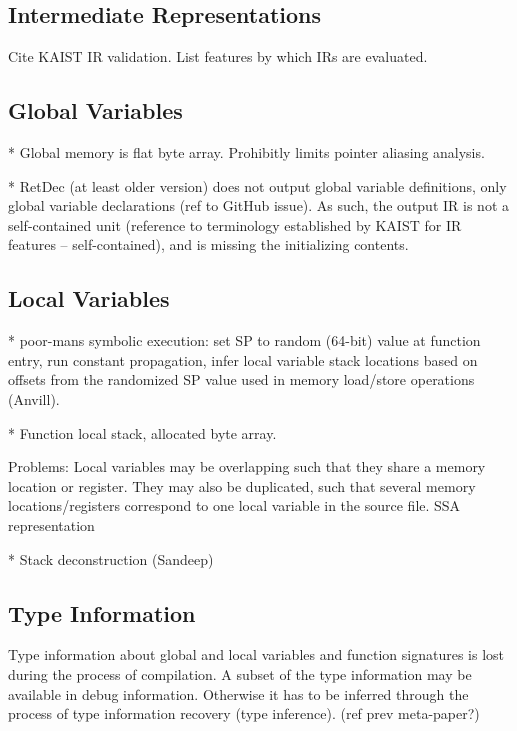 
\subsection{Intermediate Representations}

Cite KAIST IR validation. List features by which IRs are evaluated.


\subsection{Global Variables}

* Global memory is flat byte array. Prohibitly limits pointer aliasing analysis.

* RetDec (at least older version) does not output global variable definitions, only global variable declarations (ref to GitHub issue). As such, the output IR is not a self-contained unit (reference to terminology established by KAIST for IR features -- self-contained), and is missing the initializing contents.


\subsection{Local Variables}

* poor-mans symbolic execution: set SP to random (64-bit) value at function entry, run constant propagation, infer local variable stack locations based on offsets from the randomized SP value used in memory load/store operations  (Anvill).

* Function local stack, allocated byte array.

Problems: Local variables may be overlapping such that they share a memory location or register. They may also be duplicated, such that several memory locations/registers correspond to one local variable in the source file. SSA representation

* Stack deconstruction (Sandeep)


\subsection{Type Information}

Type information about global and local variables and function signatures is lost during the process of compilation. A subset of the type information may be available in debug information. Otherwise it has to be inferred through the process of type information recovery (type inference). (ref prev meta-paper?)
